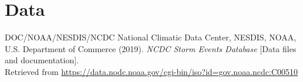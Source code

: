 \documentclass[a4paper,11pt]{texMemo}
\begin{document}
\section{Data}
DOC/NOAA/NESDIS/NCDC National Climatic Data Center, NESDIS, NOAA, U.S. Department of Commerce
(2019). \textit{NCDC Storm Events Database} [Data files and documentation]. 
\\Retrieved from \href{https://data.nodc.noaa.gov/cgi-bin/iso?id=gov.noaa.ncdc:C00510}{https://data.nodc.noaa.gov/cgi-bin/iso?id=gov.noaa.ncdc:C00510}
\end{document}
